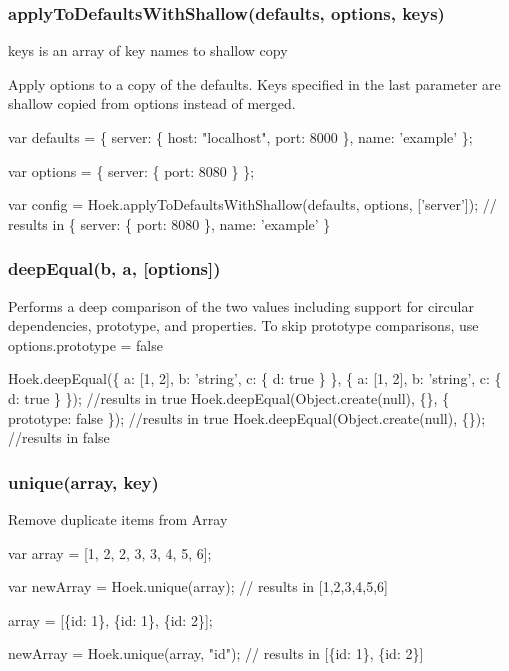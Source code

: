 \subsubsection*{apply\+To\+Defaults\+With\+Shallow(defaults, options, keys)}

keys is an array of key names to shallow copy

Apply options to a copy of the defaults. Keys specified in the last parameter are shallow copied from options instead of merged.


\begin{DoxyCode}
var defaults = \{
        server: \{
            host: "localhost",
            port: 8000
        \},
        name: 'example'
    \};

var options = \{ server: \{ port: 8080 \} \};

var config = Hoek.applyToDefaultsWithShallow(defaults, options, ['server']); // results in \{ server: \{
       port: 8080 \}, name: 'example' \}
\end{DoxyCode}


\subsubsection*{deep\+Equal(b, a, \mbox{[}options\mbox{]})}

Performs a deep comparison of the two values including support for circular dependencies, prototype, and properties. To skip prototype comparisons, use {\ttfamily options.\+prototype = false}


\begin{DoxyCode}
Hoek.deepEqual(\{ a: [1, 2], b: 'string', c: \{ d: true \} \}, \{ a: [1, 2], b: 'string', c: \{ d: true \} \});
       //results in true
Hoek.deepEqual(Object.create(null), \{\}, \{ prototype: false \}); //results in true
Hoek.deepEqual(Object.create(null), \{\}); //results in false
\end{DoxyCode}


\subsubsection*{unique(array, key)}

Remove duplicate items from Array


\begin{DoxyCode}
var array = [1, 2, 2, 3, 3, 4, 5, 6];

var newArray = Hoek.unique(array);    // results in [1,2,3,4,5,6]

array = [\{id: 1\}, \{id: 1\}, \{id: 2\}];

newArray = Hoek.unique(array, "id");  // results in [\{id: 1\}, \{id: 2\}]
\end{DoxyCode}


